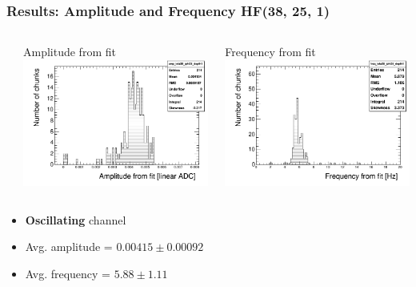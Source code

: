\documentclass[bigger]{beamer}
\providecommand{\alert}[1]{\textbf{#1}}
\begin{document}
\begin{frame}
\frametitle{Results: Amplitude and Frequency HF(38, 25, 1)}
\label{sec-3-3-7}
\begin{columns} %
\label{sec-3-3-7-1}
\begin{column}{0.55\textwidth}
\label{sec-3-3-7-1-1}

\centering
Amplitude from fit
\includegraphics[width=.9\linewidth]{fig/amp_ieta38_iphi25_depth1.png}
\end{column}
\begin{column}{0.55\textwidth}
\label{sec-3-3-7-1-2}

\centering
Frequency from fit
\includegraphics[width=.9\linewidth]{fig/freq_ieta38_iphi25_depth1.png}
\end{column}
\end{columns}
\begin{itemize}

\item \alert{Oscillating} channel
\label{sec-3-3-7-2}%

\item Avg. amplitude = $0.00415 \pm 0.00092$
\label{sec-3-3-7-3}%

\item Avg. frequency = $5.88 \pm 1.11$
\label{sec-3-3-7-4}%
\end{itemize} %
\end{frame}
\end{document}
